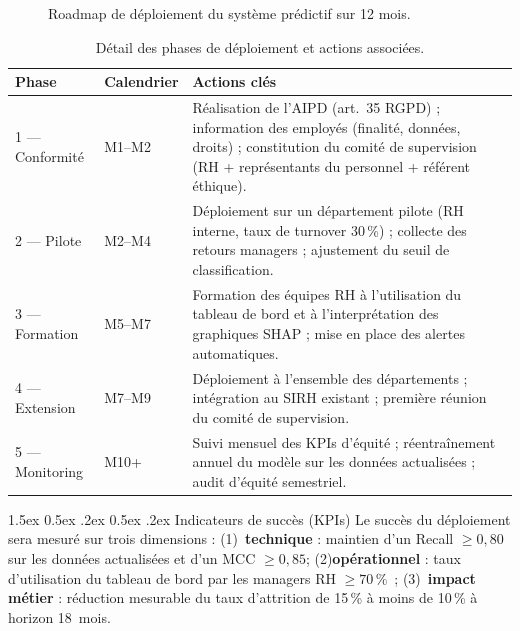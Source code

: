 \documentclass[12pt,a4paper]{article}
\makeatletter
\renewcommand\paragraph{\@startsection{paragraph}{4}{\z@}%
  {1.5ex \@plus 0.5ex \@minus .2ex}%
  {0.5ex \@plus .2ex}%
  {\normalfont\normalsize\bfseries}}
\makeatother
\begin{document}
\begin{figure}[ht]
\caption{Roadmap de déploiement du système prédictif sur 12 mois.}
\label{fig:roadmap}
\end{figure}

\begin{table}[ht]
\centering
\small
\begin{tabularx}{\textwidth}{llX}
\toprule
\textbf{Phase} & \textbf{Calendrier} & \textbf{Actions clés} \\
\midrule
1 --- Conformité & M1--M2 & Réalisation de l'AIPD (art.~35 RGPD) ; information des employés (finalité, données, droits) ; constitution du comité de supervision (RH + représentants du personnel + référent éthique). \\
\midrule
2 --- Pilote & M2--M4 & Déploiement sur un département pilote (RH interne, taux de turnover 30\,\%) ; collecte des retours managers ; ajustement du seuil de classification. \\
\midrule
3 --- Formation & M5--M7 & Formation des équipes RH à l'utilisation du tableau de bord et à l'interprétation des graphiques SHAP ; mise en place des alertes automatiques. \\
\midrule
4 --- Extension & M7--M9 & Déploiement à l'ensemble des départements ; intégration au SIRH existant ; première réunion du comité de supervision. \\
\midrule
5 --- Monitoring & M10+ & Suivi mensuel des KPIs d'équité ; réentraînement annuel du modèle sur les données actualisées ; audit d'équité semestriel. \\
\bottomrule
\end{tabularx}
\caption{Détail des phases de déploiement et actions associées.}
\end{table}

\paragraph{Indicateurs de succès (KPIs)} Le succès du déploiement
sera mesuré sur trois dimensions : (1)~\textbf{technique} :
maintien d'un Recall $\geq 0{,}80$ sur les données actualisées et
d'un MCC $\geq 0{,}85$; (2)\textbf{opérationnel} : taux
d'utilisation du tableau de bord par les managers RH $\geq 70\,\%$~;
(3)~\textbf{impact métier} : réduction mesurable du taux d'attrition
de 15\,\% à moins de 10\,\% à horizon 18~mois.
\end{document}
